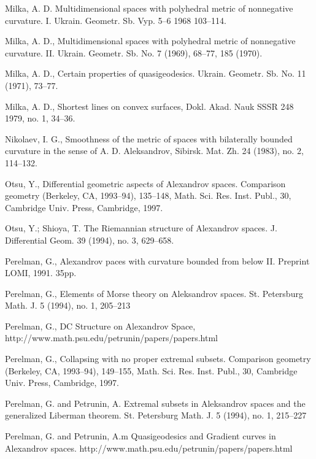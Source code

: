 \documentclass{article}
\begin{document}
\begin{thebibliography}{Bibliography}
Milka, A. D. 
Multidimensional spaces with polyhedral
metric of nonnegative curvature. I. 
Ukrain. Geometr. Sb. Vyp.  5--6 
1968 103--114. 

Milka, A. D., 
Multidimensional spaces with polyhedral
metric of nonnegative curvature. II. 
Ukrain. Geometr. Sb. No. 7
(1969), 68--77, 185 (1970).

Milka, A. D., 
Certain properties of quasigeodesics. 
Ukrain. Geometr. Sb. No. 11 (1971), 73--77.

Milka, A. D., 
Shortest lines on convex surfaces,  
Dokl. Akad. Nauk SSSR  {248}  {1979}, {no. 1}, {34--36}.


Nikolaev, I. G., 
Smoothness of the metric of spaces with bilaterally bounded curvature
in the sense of A. D. Aleksandrov, 
Sibirsk. Mat. Zh. 24 (1983), no. 2, 114--132.

Otsu, Y.,
Differential geometric aspects of Alexandrov spaces.  
Comparison
geometry (Berkeley, CA, 1993--94),  
135--148, Math. Sci. Res. Inst. Publ., 30,
Cambridge Univ. Press, Cambridge, 1997.

Otsu, Y.; Shioya, T. The Riemannian structure of Alexandrov spaces.  J.
Differential Geom.  39  (1994),  no. 3, 629--658.

Perelman, G., 
Alexandrov paces with curvature
bounded from below II. 
Preprint LOMI, 1991. 35pp.

Perelman, G., 
Elements of Morse theory on
Aleksandrov spaces.  St. Petersburg Math. J.  5  (1994),  no. 1, 205--213

Perelman, G., 
DC Structure on Alexandrov Space,\\ http://www.math.psu.edu/petrunin/papers/papers.html

Perelman, G., 
Collapsing with no proper
extremal subsets.  Comparison geometry (Berkeley, CA, 1993--94),  149--155,
Math. Sci. Res. Inst. Publ., 30, Cambridge Univ. Press, Cambridge, 1997.

Perelman, G. and   Petrunin, A. 
Extremal subsets in Aleksandrov spaces and the generalized Liberman theorem.
St. Petersburg Math. J.  5  (1994),  no. 1, 215--227

Perelman, G. and  Petrunin, A.m Quasigeodesics and Gradient curves in Alexandrov spaces. http://www.math.psu.edu/petrunin/papers/papers.html


\end{thebibliography}
\end{document}
